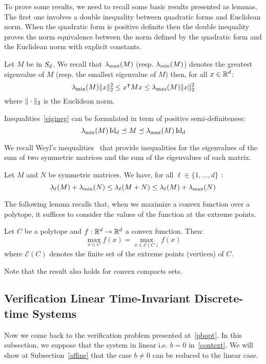 \documentclass[10pt]{article}
\begin{document}
To prove some results, we need to recall some basic results presented as lemmas. The first one involves a double inequality between quadratic forms and Euclidean norm. When the quadratic form is positive definite then the double inequality proves the norm equivalence between the norm defined by the quadratic form and the Euclidean norm with explicit constants. 
\begin{lemma}
\label{lemma1}
Let $M$ be in $S_d$. We recall that $\lambda_{\operatorname{max}}(M)$ (resp. $\lambda_{\operatorname{min}}(M)$) denotes the greatest eigenvalue of $M$ (resp. the smallest eigenvalue of $M$) then, for all $x\in \mathbb R^d$:
\begin{equation}
\label{eigineg}
\lambda_{\operatorname{min}}(M)\| x\|_2^2\leq x^\intercal M x\leq \lambda_{\operatorname{max}}(M) \| x\|_2^2
\end{equation}
where $\| \cdot\|_2$ is the Euclidean norm. 
\end{lemma}
Inequalities~\eqref{eigineg} can be formulated in term of positive semi-definiteness:
\[
\lambda_{\operatorname{min}}(M)\operatorname{Id}_d\preceq M\preceq \lambda_{\operatorname{max}}(M)\operatorname{Id}_d
\]

We recall Weyl's inequalities~\cite{horn1990matrix} that provide inequalities for the eigenvalues of the sum of two symmetric matrices and the sum of the eigenvalues of each matrix.  
\begin{lemma}
\label{lemmaWeyl}
Let $M$ and $N$ be symmetric matrices. We have, for all $\ell\in\{1,\ldots,d\}$ :
\[
\lambda_\ell(M)+\lambda_{\operatorname{min}}(N)\leq \lambda_\ell(M+N)\leq \lambda_\ell(M)+\lambda_{\operatorname{max}}(N)
\]
\end{lemma}
The following lemma recalls that, when we maximize a convex function over a polytope, it suffices to consider the values of the function at the extreme points. 
\begin{lemma}
\label{lemma2}
Let $C$ be a polytope and $f:\mathbb R^d\to\mathbb R^d$ a convex function. Then:
\[
\max_{x\in C} f(x)=\max_{x\in \mathcal{E}(C)} f(x)
\]
where $\mathcal{E}(C)$ denotes the finite set of the extreme points (vertices) of $C$.
\end{lemma}
Note that the result also holds for convex compacts sets.  
\subsection{Verification Linear Time-Invariant Discrete-time Systems}
\label{mainsub}
Now we come back to the verification problem presented at~\eqref{pbopt}. In this subsection, we suppose that the system in linear i.e. $b=0$ in~\eqref{context}. We will show at Subsection~\ref{affine} that the case $b\neq 0$ can be reduced to the linear case.
\end{document}
